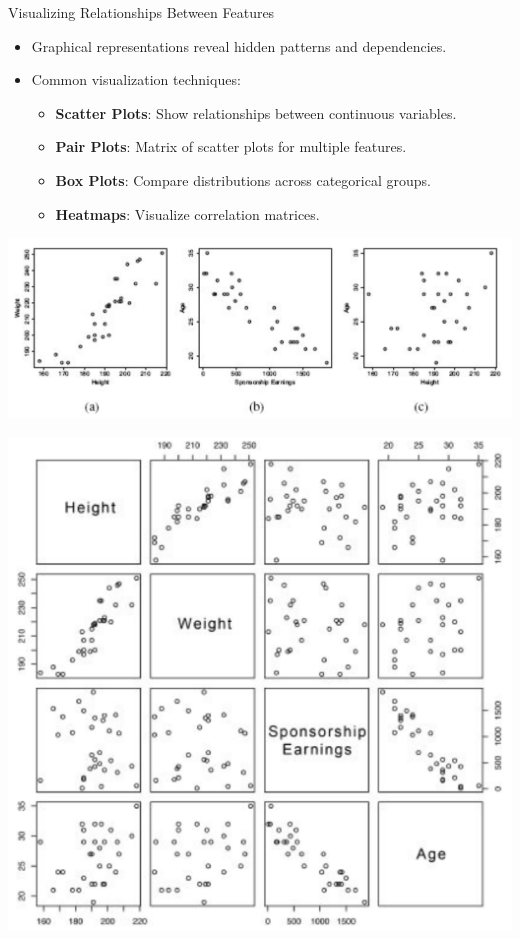 \documentclass[aspectratio=169,xcolor=dvipsnames]{beamer}
\begin{document}
\begin{frame}{Visualizing Relationships Between Features}
\begin{itemize}
    \setlength\itemsep{0.25cm}
    \item Graphical representations reveal hidden patterns and dependencies.
    \item Common visualization techniques:
    \begin{itemize}
        \item \textbf{Scatter Plots}: Show relationships between continuous variables.
        \item \textbf{Pair Plots}: Matrix of scatter plots for multiple features.
        \item \textbf{Box Plots}: Compare distributions across categorical groups.
        \item \textbf{Heatmaps}: Visualize correlation matrices.
    \end{itemize}
\end{itemize}
\centering
\includegraphics[scale=0.33]{images/covariates.png}
\end{frame}
\begin{frame}
\centering
\includegraphics[scale=0.45]{images/splot_mat.png}
\end{frame}
\end{document}
